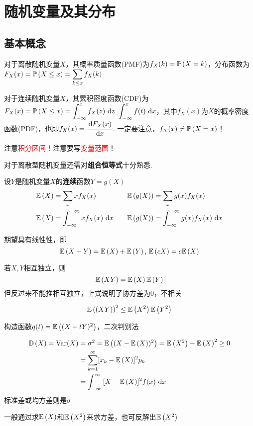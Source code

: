 
\section{随机变量及其分布}
\subsection{基本概念}
\begin{definition}
对于离散随机变量$X$，其概率质量函数(PMF)为$f_X(k)=\pr{X=k}$，分布函数为$\disp F_X(x)=\pr{X\leq x}=\sum_{k\leq x}f_X(k)$
\end{definition}
\begin{definition}
对于连续随机变量$X$，其累积密度函数(CDF)为$F_X(x)=\pr{X\leq x}=\intabu{-\infty}{x}{f_X(z)}{z}$
$\displaystyle \intab{-\infty}{x}{f(t)}$，其中$f_X(x)$为$X$的概率密度函数(PDF)，也即$f_X(x)=\dfrac{\diff F_X(x)}{\diff x}$.
一定要注意，$f_X(x)\ne\pr{X=x}$！
\end{definition}
注意\textcolor{red}{积分区间}！注意要写\textcolor{red}{变量范围}！
\par 对于离散型随机变量还需对\textbf{组合恒等式}十分熟悉.
\begin{definition}[期望]
设$Y$是随机变量$X$的\textbf{连续}函数$Y=g(X)$
\[\begin{aligned}
\E{X}&=\sum_x xf_X(x) \quad& \E{g(X)}&=\sum_x g(x)f_X(x)\\
\E{X}&=\intab{-\infty}{+\infty}{xf_X(x)} \quad& \E{g(X)}&=\intab{-\infty}{+\infty}{g(x)f_X(x)}
\end{aligned}\]
\end{definition}
\par 期望具有线性性，即
\[\E{X+Y}=\E{X}+\E{Y},\,\E{cX}=c\E{X}\]
\par 若$X,Y$相互独立，则
\[\E{XY}=\E{X}\E{Y}\]
但反过来不能推相互独立，上式说明了协方差为0，不相关
\begin{theorem}
\[\E{(XY)}^2\leq\E{X^2}\E{Y^2}\]
\end{theorem}
\begin{analysis}
构造函数$q(t)=\E{(X+tY)^2}$，二次判别法
\end{analysis}
\begin{definition}[方差]
\[\begin{aligned}
\Var{X}=\mathrm{Var}(X)&=\sigma^2=\E{(X-\E{X})^2}=\E{X^2}-\E{X}^2\geq 0\\
&=\sum_{k=1}^\infty[x_k-\E{X}]^2p_k\\
&=\intab{-\infty}{\infty}{[X-\E{X}]^2f(x)}
\end{aligned}\]
标准差或均方差则是$\sigma$
\end{definition}
一般通过求$\E{X}$和$\E{X^2}$来求方差，也可反解出$\E{X^2}$

